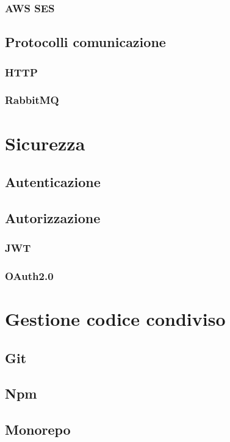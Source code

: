 \subsubsection{AWS SES}

\subsection{Protocolli comunicazione}
\subsubsection{HTTP}

\subsubsection{RabbitMQ}


\section{Sicurezza}
\subsection{Autenticazione}

\subsection{Autorizzazione}

\subsubsection{JWT}

\subsubsection{OAuth2.0}


\section{Gestione codice condiviso}
\subsection{Git}

\subsection{Npm}

\subsection{Monorepo}

